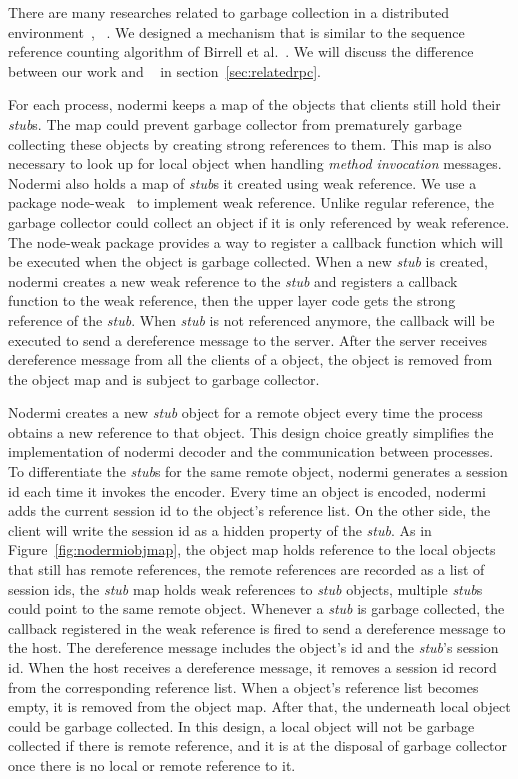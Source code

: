 There are many researches related to garbage collection in a distributed
environment~\cite{abdullahi1998garbage}, ~\cite{birrell1993distributed}.
We designed a mechanism that is similar to the sequence reference counting algorithm
of Birrell et al.~\cite{birrell1993distributed}.
We will discuss the difference between our work and ~\cite{birrell1993distributed}
in section~\ref{sec:relatedrpc}.

For each process, nodermi keeps a map of the objects that clients still hold
their \emph{stub}s.
The map could prevent garbage collector from prematurely garbage collecting
these objects by creating strong references to them.
This map is also necessary to look up for local object when handling \emph{method invocation} messages.
Nodermi also holds a map of \emph{stub}s it created using weak reference.
We use a \nodejs{} package node-weak~\cite{nodeweak} to implement weak reference.
Unlike regular reference, the garbage collector could collect an object if it is only
referenced by weak reference.
The node-weak package provides a way to register a callback function which will
be executed when the object is garbage collected.
When a new \emph{stub} is created, nodermi creates a new weak reference to
the \emph{stub} and registers a callback function to the weak reference,
then the upper layer code gets the strong reference of the \emph{stub}.
When \emph{stub} is not referenced anymore,
the callback will be executed to send a dereference message to the server.
After the server receives dereference message from all the clients of a object,
the object is removed from the object map and is subject to garbage collector.


\nodrmiobjmapfig{}

Nodermi creates a new \emph{stub} object for a remote object every time
the process obtains a new reference to that object.
This design choice greatly simplifies the implementation of nodermi decoder and
the communication between processes.
To differentiate the \emph{stub}s for the same remote object,
nodermi generates a session id each time it invokes the encoder.
Every time an object is encoded, nodermi adds the current session id
to the object's reference list.
On the other side,
the client will write the session id as a hidden property of the \emph{stub}.
As in Figure~\ref{fig:nodermiobjmap}, the object map holds reference to
the local objects that still has remote references,
the remote references are recorded as a list of session ids,
the \emph{stub} map holds weak references to \emph{stub} objects,
multiple \emph{stub}s could point to the same remote object.
Whenever a \emph{stub} is garbage collected,
the callback registered in the weak reference is fired to send a dereference message
to the host.
The dereference message includes the object's id and the \emph{stub}'s session id.
When the host receives a dereference message, it removes a session id record from
the corresponding reference list.
When a object's reference list becomes empty, it is removed from the object map.
After that, the underneath local object could be garbage collected.
In this design, a local object will not be garbage collected if there is
remote reference, and it is at the disposal of garbage collector once there is
no local or remote reference to it.

